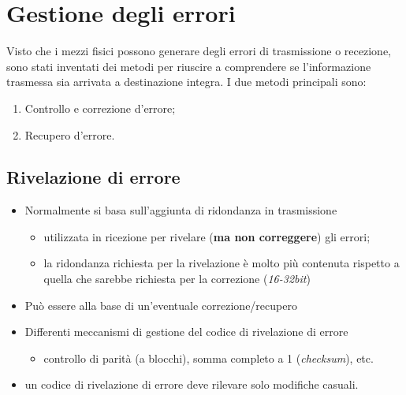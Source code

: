 \documentclass{book}
\begin{document}
\section{Gestione degli errori}
Visto che i mezzi fisici possono generare degli errori di trasmissione o
recezione, sono stati inventati dei metodi per riuscire a comprendere se
l'informazione trasmessa sia arrivata a destinazione integra. I due metodi
principali sono:
\begin{enumerate}
	\item Controllo e correzione d'errore;
	\item Recupero d'errore.
\end{enumerate}
\subsection{Rivelazione di errore}
\begin{itemize}
	\item Normalmente si basa sull'aggiunta di ridondanza in trasmissione
		\begin{itemize}
			\item utilizzata in ricezione per rivelare ({\bf ma non correggere})
				gli errori;
			\item la ridondanza richiesta per la rivelazione è molto più
				contenuta rispetto a quella che sarebbe richiesta per la
				correzione (\textit{16-32bit})
		\end{itemize}
	\item Può essere alla base di un'eventuale correzione/recupero
	\item Differenti meccanismi di gestione del codice di rivelazione di errore
		\begin{itemize}
			\item controllo di parità (a blocchi), somma completo a 1
				(\textit{checksum}), etc.
		\end{itemize}
	\item un codice di rivelazione di errore deve rilevare solo modifiche
		casuali.
\end{itemize}
\end{document}
